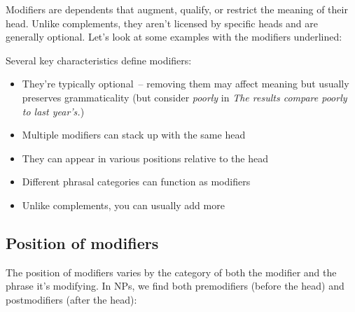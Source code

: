 Modifiers are dependents that augment, qualify, or restrict the meaning of their head. Unlike complements, they aren't licensed by specific heads and are generally optional. Let's look at some examples with the modifiers underlined:

\ea\label{ex:modifier-types}
   \z
\z

Several key characteristics define modifiers:

\begin{itemize}[noitemsep]
   \item They're typically optional~-- removing them may affect meaning but usually preserves grammaticality (but consider \textit{poorly} in \textit{The results compare poorly to last year's.})
   \item Multiple modifiers can stack up with the same head
   \item They can appear in various positions relative to the head
   \item Different phrasal categories can function as modifiers
   \item Unlike complements, you can usually add more 
\end{itemize}

\subsection{Position of modifiers}

The position of modifiers varies by the category of both the modifier and the phrase it's modifying. In NPs, we find both premodifiers (before the head) and postmodifiers (after the head):

\ea\label{ex:np-modifiers}
   \z
\z

